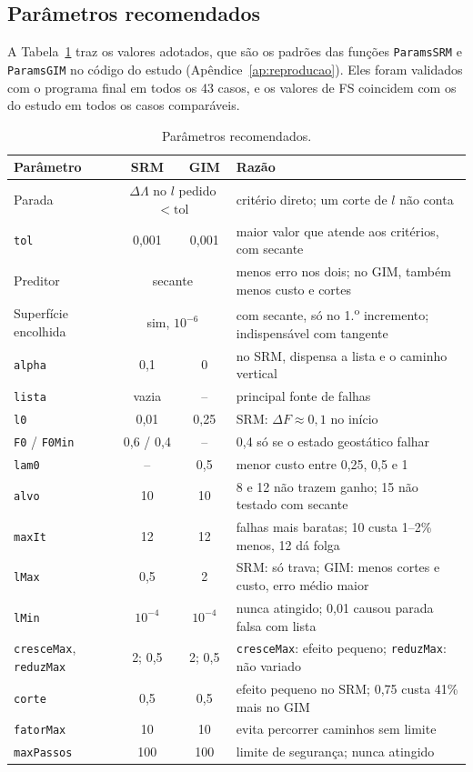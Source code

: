 \documentclass[11pt,a4paper]{article}
\numberwithin{equation}{section}
\begin{document}
\subsection{Parâmetros recomendados}\label{sec:recomendacao}

A Tabela~\ref{tab:recomendados} traz os valores adotados, que são os padrões das funções \texttt{ParamsSRM} e \texttt{ParamsGIM} no código do estudo (Apêndice~\ref{ap:reproducao}). Eles foram validados com o programa final em todos os 43 casos, e os valores de FS coincidem com os do estudo em todos os casos comparáveis.

\begin{table}[htbp]
\centering\small
\caption{Parâmetros recomendados.}\label{tab:recomendados}
\begin{tabular}{lccp{7.2cm}}
\toprule
Parâmetro & SRM & GIM & Razão \\
\midrule
Parada & \multicolumn{2}{c}{$\Delta\Lambda$ no $l$ pedido $< \mathrm{tol}$} & critério direto; um corte de $l$ não conta \\
\texttt{tol} & 0,001 & 0,001 & maior valor que atende aos critérios, com secante \\
Preditor & \multicolumn{2}{c}{secante} & menos erro nos dois; no GIM, também menos custo e cortes \\
Superfície encolhida & \multicolumn{2}{c}{sim, $10^{-6}$} & com secante, só no 1.\textsuperscript{o} incremento; indispensável com tangente \\
\texttt{alpha} & 0,1 & 0 & no SRM, dispensa a lista e o caminho vertical \\
\texttt{lista} & vazia & -- & principal fonte de falhas \\
\texttt{l0} & 0,01 & 0,25 & SRM: $\Delta F \approx 0{,}1$ no início \\
\texttt{F0} / \texttt{F0Min} & 0,6 / 0,4 & -- & 0,4 só se o estado geostático falhar \\
\texttt{lam0} & -- & 0,5 & menor custo entre 0,25, 0,5 e 1 \\
\texttt{alvo} & 10 & 10 & 8 e 12 não trazem ganho; 15 não testado com secante \\
\texttt{maxIt} & 12 & 12 & falhas mais baratas; 10 custa 1--2\% menos, 12 dá folga \\
\texttt{lMax} & 0,5 & 2 & SRM: só trava; GIM: menos cortes e custo, erro médio maior \\
\texttt{lMin} & $10^{-4}$ & $10^{-4}$ & nunca atingido; 0,01 causou parada falsa com lista \\
\texttt{cresceMax}, \texttt{reduzMax} & 2; 0,5 & 2; 0,5 & \texttt{cresceMax}: efeito pequeno; \texttt{reduzMax}: não variado \\
\texttt{corte} & 0,5 & 0,5 & efeito pequeno no SRM; 0,75 custa 41\% mais no GIM \\
\texttt{fatorMax} & 10 & 10 & evita percorrer caminhos sem limite \\
\texttt{maxPassos} & 100 & 100 & limite de segurança; nunca atingido \\
\bottomrule
\end{tabular}
\end{table}
\end{document}
